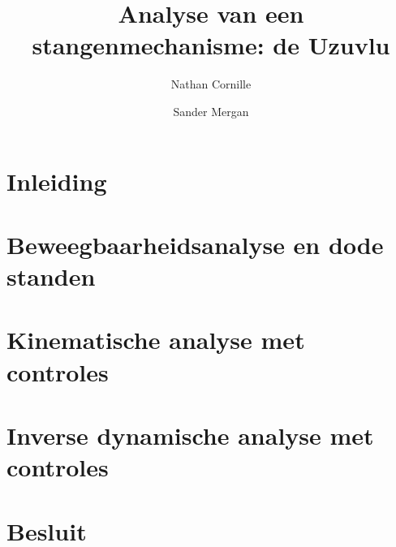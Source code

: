 \documentclass[12pt]{article}
\title{Analyse van een stangenmechanisme: de Uzuvlu}
\author{Nathan Cornille \and Sander Mergan}
\begin{document}
\maketitle
\newpage
\tableofcontents

\newpage
\section{Inleiding}\label{inleiding}
\clearpage
\section{Beweegbaarheidsanalyse en dode standen}\label{Beweegbaarheidsanalyse en dode standen}
\clearpage
\section{Kinematische analyse met controles}\label{Kinematische analyse}
\clearpage
\section{Inverse dynamische analyse met controles}\label{Dynamische analyse}
\clearpage
\section{Besluit}\label{Besluit}
\clearpage
\end{document}
